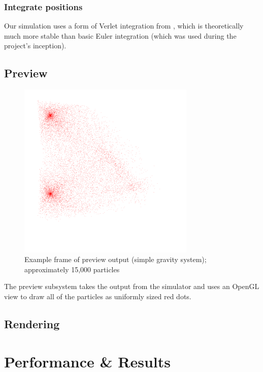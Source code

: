 \documentclass{acmsiggraph}
\begin{document}
\subsubsection{Integrate positions}

Our simulation uses a form of Verlet integration from \cite{verlet}, which is theoretically much more stable than basic Euler integration (which was used during the project's inception).

\subsection{Preview}

\begin{figure}
    \includegraphics[width=84.5mm]{preview.png}
    \caption{Example frame of preview output (simple gravity system); approximately 15,000 particles}
    \label{fig:preview}
\end{figure}

The preview subsystem takes the output from the simulator and uses an OpenGL view to draw all of the particles as uniformly sized red dots.

\subsection{Rendering}

\section{Performance \& Results}

\label{performanceSection}
\end{document}
